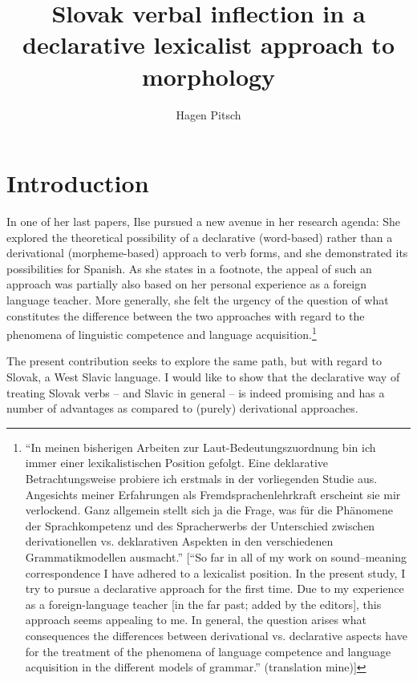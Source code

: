 \documentclass[output=paper,colorlinks,citecolor=brown]{langscibook}
\author{Hagen Pitsch\affiliation{University of Göttingen}\orcid{0000-0002-7575-8903}}
\title{Slovak verbal inflection in a declarative lexicalist approach to morphology}
\begin{document}
\maketitle


\section{Introduction}\label{sec:Intro}
\largerpage[-5]
In one of her last papers, Ilse \citet{Zimmermann2019} pursued a new avenue in her research agenda: She explored the theoretical possibility of a declarative (word-based) rather than a derivational (morpheme-based) approach to verb forms, and she demonstrated its possibilities for Spanish. As she states in a footnote, the appeal of such an approach was partially also based on her personal experience as a foreign language teacher. More generally, she felt the urgency of the question of what constitutes the difference between the two approaches with regard to the phenomena of linguistic competence and language acquisition.\footnote{``In meinen bisherigen Arbeiten zur Laut-Bedeutungszuordnung bin ich immer einer lexikali\-stischen Position gefolgt. Eine deklarative Betrachtungsweise probiere ich erstmals in der vorliegenden Studie aus. Angesichts meiner Erfahrungen als Fremdsprachenlehrkraft erscheint sie mir verlockend. Ganz allgemein stellt sich ja die Frage, was für die Phänomene der Sprachkompetenz und des Spracherwerbs der Unterschied zwischen derivationellen vs. deklarativen Aspekten in den verschiedenen Grammatikmodellen ausmacht.'' \citep[1]{Zimmermann2019} [``So far in all of my work on sound–meaning correspondence I have adhered to a lexicalist position. In the present study, I try to pursue a declarative approach for the first time. Due to my experience as a foreign-language teacher [in the far past; added by the editors], this approach seems appealing to me. In general, the question arises what consequences the differences between derivational vs. declarative aspects have for the treatment of the phenomena of language competence and language acquisition in the different models of grammar.'' (translation mine)]}

The present contribution seeks to explore the same path, but with regard to Slovak, a West Slavic language. I would like to show that the declarative way of treating Slovak verbs -- and Slavic in general -- is indeed promising and has a number of advantages as compared to (purely) derivational approaches. 
\end{document}
